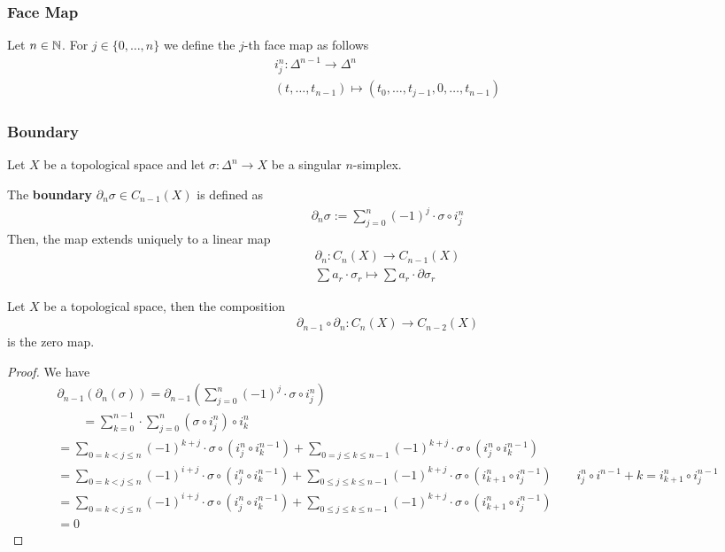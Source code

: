 \documentclass[Total.tex]{subfiles}
\begin{document}
			\subsubsection{Face Map}
			\begin{Def}
				Let $n\in \mathbb{N}$. For $j\in \{0,\dots,n\}$ we define the $j$-th face map as follows
				\begin{gather*}
					i^n_j:\Delta^{n-1}\rightarrow \Delta^n\\
					(t,\dots,t_{n-1})\mapsto (t_0,\dots,t_{j-1},0,\dots,t_{n-1})
				\end{gather*}
			\end{Def}
			\subsubsection{Boundary}
			\begin{Def}
				Let $X$ be a topological space and let $\sigma:\Delta^n\rightarrow X$ be a singular $n$-simplex. 
				
				The \textbf{boundary} $\partial_n \sigma\in C_{n-1}(X)$ is defined as
				\begin{gather*}
					\partial_n \sigma:=\sum_{j=0}^n (-1)^j\cdot \sigma\circ i^n_j
				\end{gather*}
				Then, the map extends uniquely to a linear map
				\begin{gather*}
					\partial_n:C_n(X)\rightarrow C_{n-1}(X)\\
					\sum a_r\cdot \sigma_r\mapsto \sum a_r\cdot \partial \sigma_r
				\end{gather*}
			\end{Def}
			\begin{proposition}
				Let $X$ be a topological space, then the composition
				\begin{gather*}
					\partial_{n-1}\circ \partial_n:C_n(X)\rightarrow C_{n-2}(X)
				\end{gather*}
				is the zero map.
			\end{proposition}
			\begin{proof}
				We have
				\begin{gather*}
					\partial_{n-1}(\partial_n (\sigma))=\partial_{n-1} (\sum_{j=0}^n (-1)^j\cdot \sigma\circ i^n_j)\\
					\qquad=\sum_{k=0}^{n-1}\cdot \sum_{j=0}^n (\sigma\circ i^n_j)\circ i^n_k\\
					=\sum_{0=k<j\leq n} (-1)^{k+j}\cdot \sigma\circ (i^n_j\circ i^{n-1}_k)+\sum_{0=j\leq k\leq n-1} (-1)^{k+j}\cdot \sigma\circ (i^n_j\circ i^{n-1}_k)\\
					=\sum_{0=k<j\leq n}(-1)^{i+j}\cdot \sigma\circ (i^n_j\circ i_k^{n-1})+\sum_{0\leq j\leq k\leq n-1}(-1)^{k+j}\cdot \sigma\circ (i^n_{k+1}\circ i^{n-1}_j)\qquad i^n_j\circ i^{n-1}+k=i^n_{k+1}\circ i_j^{n-1}\\
					=\sum_{0=k<j\leq n}(-1)^{i+j}\cdot \sigma\circ (i^n_j\circ i_k^{n-1})+\sum_{0\leq j\leq k\leq n-1}(-1)^{k+j}\cdot \sigma\circ (i^n_{k+1}\circ i^{n-1}_j)\\
					=0
				\end{gather*}
			\end{proof}
\end{document}
